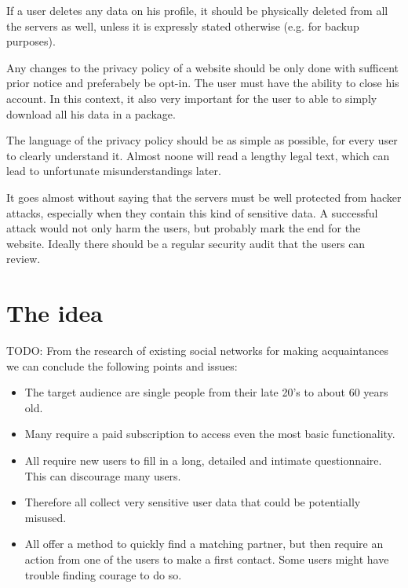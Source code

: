 \documentclass[12pt,oneside]{fithesis}
\begin{document}
	If a user deletes any data on his profile, it should be physically deleted from all the servers as well, unless it is expressly stated otherwise (e.g. for backup purposes).
	
	Any changes to the privacy policy of a website should be only done with sufficent prior notice and preferabely be opt-in. The user must have the ability to close his account. In this context, it also very important for the user to able to simply download all his data in a package.
	
	The language of the privacy policy should be as simple as possible, for every user to clearly understand it. Almost noone will read a lengthy legal text, which can lead to unfortunate misunderstandings later.
	
	It goes almost without saying that the servers must be well protected from hacker attacks, especially when they contain this kind of sensitive data. A successful attack would not only harm the users, but probably mark the end for the website. Ideally there should be a regular security audit that the users can review.

\section{The idea}
	TODO:
	\cite{Finkel01012012}
	From the research of existing social networks for making acquaintances we can conclude the following points and issues:
	\begin{itemize}
		\item The target audience are single people from their late 20's to about 60 years old.
		\item Many require a paid subscription to access even the most basic functionality.
		\item All require new users to fill in a long, detailed and intimate questionnaire. This can discourage many users.
		\item Therefore all collect very sensitive user data that could be potentially misused.
		\item All offer a method to quickly find a matching partner, but then require an action from one of the users to make a first contact. Some users might have trouble finding courage to do so.
	\end{itemize}
\end{document}
